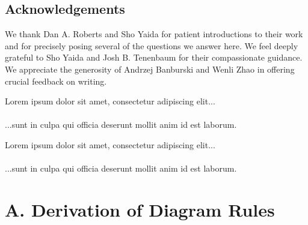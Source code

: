 \documentclass{article}
\newcommand{\lorem}[1]{
    Lorem ipsum dolor sit amet, consectetur adipiscing elit...\\
    \nopagebreak\vspace{#1cm} \ \\
    ...sunt in culpa qui officia deserunt mollit anim id est laborum.
}
\begin{document}
\subsection{Acknowledgements}
    We thank Dan A. Roberts and Sho Yaida for patient introductions to their
    work and for precisely posing several of the questions we answer here.  We
    feel deeply grateful to Sho Yaida and Josh B. Tenenbaum for their
    compassionate guidance.  We appreciate the generosity of
        Andrzej Banburski
        and
        Wenli Zhao
    in offering crucial feedback on writing.


    
    

    \lorem{3}
    \lorem{3}


\section*{A. Derivation of Diagram Rules}
\end{document}
